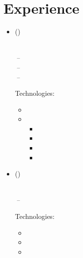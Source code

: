 \documentclass[11pt,a4paper]{article}
\begin{document}
\section{Experience}
\begin{itemize}[leftmargin=0pt,label={},itemsep=2em,topsep=0pt]
\item \parbox{\textwidth}{\textbf{\KhonraadName} {\color{secondary}\small(\KhonraadCompanyDescription)} \hfill \textit{\KhonraadLocation}}\\
\textit{\KhonraadThirdJobTitle} \hfill \textit{\KhonraadThirdJobStart\,--\,\KhonraadThirdJobEnd}\\
\textit{\KhonraadSecondJobTitle} \hfill \textit{\KhonraadSecondJobStart\,--\,\KhonraadSecondJobEnd}\\
\textit{\KhonraadFirstJobTitle} \hfill \textit{\KhonraadFirstJobStart\,--\,\KhonraadFirstJobEnd}

\vspace{0.2cm}
{\color{secondary}Technologies:} \KhonraadTechnology
\vspace{0.3cm}
\begin{itemize}[leftmargin=*,topsep=-6pt,parsep=0pt,partopsep=0pt,itemsep=0pt]
    \item \KhonraadJava
    \item \KhonraadInnovation
    \begin{itemize}[leftmargin=*,topsep=0pt,parsep=0pt,partopsep=0pt,itemsep=0pt,label={--}]
        \item \KhonraadChatbots
        \item \KhonraadMobile
        \item \KhonraadAndroid
        \item \KhonraadMPS
    \end{itemize}
\end{itemize} 


\item \parbox{\textwidth}{\textbf{\McfunshineName} {\color{secondary}\small(\McfunshineCompanyDescription)} \hfill \textit{\McfunshineLocation}}\\
\textit{\McfunshineJobTitle} \hfill \textit{\McfunshineJobStart\,--\,\McfunshineJobEnd}

\vspace{0.2cm}
{\color{secondary}Technologies:} \McfunshinePodmorphTechnology
\vspace{0.3cm}
\begin{itemize}[leftmargin=*,topsep=-6pt,parsep=0pt,partopsep=0pt,itemsep=0pt]
    \item \McfunshinePodmorph
    \item \McfunshinePodmorphAI
    \item \McfunshinePodmorphBaker
\end{itemize}


\end{itemize}
\end{document}
